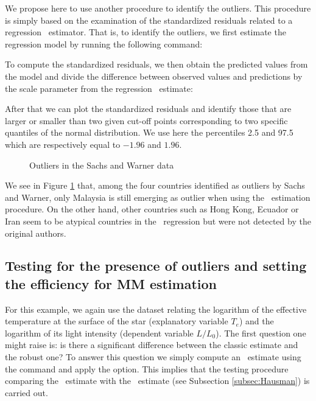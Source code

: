 We propose here to use another procedure to identify the outliers. This
procedure is simply based on the examination of the standardized residuals
related to a regression ~estimator. That is, to identify the outliers,
we first estimate the regression model by running the following command:

\begin{stlog}

\end{stlog}

To compute the standardized residuals, we then obtain the predicted values from
the model and divide the difference between observed values and predictions by
the scale parameter from the regression ~estimate:

\begin{stlog}

\end{stlog}

After that we can plot the standardized residuals and identify those that are
larger or smaller than two given cut-off points corresponding to two specific
quantiles of the normal distribution. We use here the percentiles 2.5 and 97.5
which are respectively equal to $-1.96$ and $1.96$.

\begin{stlog}

\end{stlog}

\begin{figure}[h!]
    \centering
    \caption{Outliers in the Sachs and Warner data}
    \label{fig:countries_S_standardized_res}
\end{figure}

We see in Figure \ref{fig:countries_S_standardized_res} that, among the four
countries identified as outliers by Sachs and Warner, only Malaysia is still
emerging as outlier when using the ~estimation procedure. On the other
hand, other countries such as Hong Kong, Ecuador or Iran seem to be atypical
countries in the ~regression but were not detected by the original
authors.

\subsection{Testing for the presence of outliers and setting the efficiency for MM estimation}

For this example, we again use the dataset relating the logarithm of the
effective temperature at the surface of the star (explanatory variable $T_{e}$)
and the logarithm of its light intensity (dependent variable $L/L_0$). The
first question one might raise is: is there a significant difference between
the classic estimate and the robust one? To answer this question we simply
compute an ~estimate using the  command and apply the
 option. This implies that the testing procedure comparing the
~estimate with the ~estimate (see Subsection
\ref{subsec:Hausman}) is carried out.

